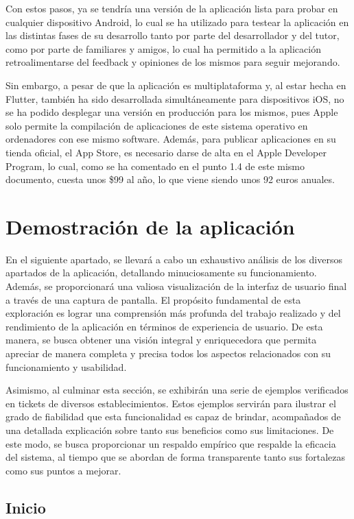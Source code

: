 \documentclass{article}
\begin{document}
Con estos pasos, ya se tendría una versión de la aplicación lista para probar en cualquier dispositivo Android, lo cual se ha utilizado para testear la aplicación en las distintas fases de su desarrollo tanto por parte del desarrollador y del tutor, como por parte de familiares y amigos, lo cual ha permitido a la aplicación retroalimentarse del feedback y opiniones de los mismos para seguir mejorando.

Sin embargo, a pesar de que la aplicación es multiplataforma y, al estar hecha en Flutter, también ha sido desarrollada simultáneamente para dispositivos iOS, no se ha podido desplegar una versión en producción para los mismos, pues Apple solo permite la compilación de aplicaciones de este sistema operativo en ordenadores con ese mismo software. Además, para publicar aplicaciones en su tienda oficial, el App Store, es necesario darse de alta en el Apple Developer Program, lo cual, como se ha comentado en el punto 1.4 de este mismo documento, cuesta unos \$99 al año, lo que viene siendo unos 92 euros anuales.

\section{Demostración de la aplicación}

En el siguiente apartado, se llevará a cabo un exhaustivo análisis de los diversos apartados de la aplicación, detallando minuciosamente su funcionamiento. Además, se proporcionará una valiosa visualización de la interfaz de usuario final a través de una captura de pantalla. El propósito fundamental de esta exploración es lograr una comprensión más profunda del trabajo realizado y del rendimiento de la aplicación en términos de experiencia de usuario. De esta manera, se busca obtener una visión integral y enriquecedora que permita apreciar de manera completa y precisa todos los aspectos relacionados con su funcionamiento y usabilidad.

Asimismo, al culminar esta sección, se exhibirán una serie de ejemplos verificados en tickets de diversos establecimientos. Estos ejemplos servirán para ilustrar el grado de fiabilidad que esta funcionalidad es capaz de brindar, acompañados de una detallada explicación sobre tanto sus beneficios como sus limitaciones. De este modo, se busca proporcionar un respaldo empírico que respalde la eficacia del sistema, al tiempo que se abordan de forma transparente tanto sus fortalezas como sus puntos a mejorar.

\subsection{Inicio}
\end{document}
